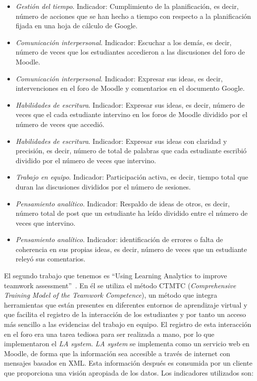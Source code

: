 \begin{itemize}
\item \emph{Gestión del tiempo}. Indicador: Cumplimiento de la planificación, es decir, número de acciones que se han hecho a tiempo con respecto a la planificación fijada en una hoja de cálculo de Google.
\item \emph{Comunicación interpersonal}. Indicador: Escuchar a los demás, es decir, número de veces que los estudiantes accedieron a las discusiones del foro de Moodle.
\item \emph{Comunicación interpersonal}. Indicador: Expresar sus ideas, es decir, intervenciones en el foro de Moodle y comentarios en el documento Google.
\item \emph{Habilidades de escritura}. Indicador: Expresar sus ideas, es decir, número de veces que el cada estudiante intervino en los foros de Moodle dividido por el número de veces que accedió.
\item \emph{Habilidades de escritura}. Indicador: Expresar sus ideas con claridad y precisión, es decir, número de total de palabras que cada estudiante escribió dividido por el número de veces que intervino.
\item \emph{Trabajo en equipo}. Indicador: Participación activa, es decir, tiempo total que duran las discusiones divididos por el número de sesiones.
\item \emph{Pensamiento analítico}. Indicador: Respaldo de ideas de otros, es decir, número total de post que un estudiante ha leído dividido entre el número de veces que intervino.
\item \emph{Pensamiento analítico}. Indicador: identificación de errores o falta de coherencia en sus propias ideas, es decir, número de veces que un estudiante releyó sus comentarios.
\end{itemize}

El segundo trabajo que tenemos es “Using Learning Analytics to improve teamwork assessment”~\cite{fidalgo:2015}. En él se utiliza el método CTMTC (\emph{Comprehensive Training Model of the Teamwork Competence}), un método que integra herramientas que están presentes en diferentes entornos de aprendizaje virtual y que facilita el registro de la interacción de los estudiantes y por tanto un acceso más sencillo a las evidencias del trabajo en equipo. El registro de esta interacción en el foro era una tarea tediosa para ser realizada a mano, por lo que implementaron el \emph{LA system}. \emph{LA system} se implementa como un servicio web en Moodle, de forma que la información sea accesible a través de internet con mensajes basados en XML. Esta información después es consumida por un cliente que proporciona una visión apropiada de los datos. Los indicadores utilizados son:

